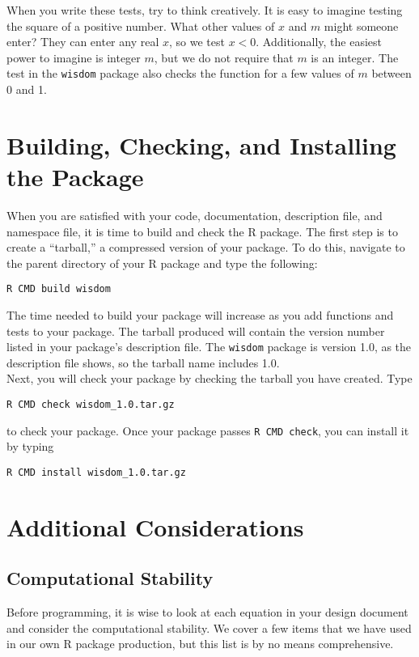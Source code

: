 \documentclass{article}
\begin{document}
 When you write these tests, try to think creatively. It is easy to imagine testing the square of a positive number. What other values of $x$ and $m$ might someone enter? They can enter any real $x$, so we test $x < 0$. Additionally, the easiest power to imagine is integer $m$, but we do not require that $m$ is an integer. The test in the \texttt{wisdom} package also checks  the function for a few values of $m$ between 0 and 1.\\








\section{Building, Checking, and Installing the Package}
When you are satisfied with your code, documentation, description file, and namespace file, it is time to build and check the R package. The first step is to create a ``tarball,'' a compressed version of your package. To do this, navigate to the parent directory of your R package and type the following:
\begin{verbatim}
R CMD build wisdom
\end{verbatim}
The time needed to build your package will increase as you add functions and tests to your package.  The tarball produced will contain the version number listed in your package's description file.  The \texttt{wisdom} package is version 1.0, as the description file shows, so the tarball name includes 1.0. \\

Next, you will check your package by checking the tarball you have created. Type
\begin{verbatim}
R CMD check wisdom_1.0.tar.gz 
\end{verbatim} 
to check your package. Once your package passes \texttt{R CMD check}, you can install it by typing
\begin{verbatim}
R CMD install wisdom_1.0.tar.gz 
\end{verbatim} 


\section{Additional Considerations}


\subsection{Computational Stability}
Before programming, it is wise to  look at each equation in your design document and consider the computational stability. We cover a few items that we have used in our own R package production, but this list is by no means comprehensive.
\end{document}
